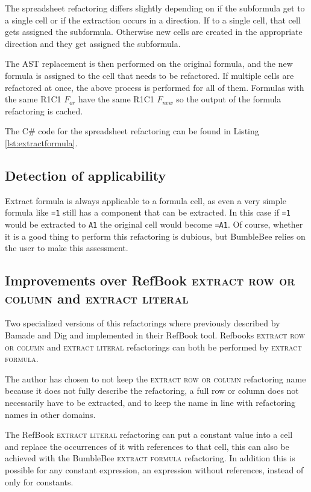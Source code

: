 \documentclass[12pt,a4paper,onecolumn,oneside,parskip]{memoir}
\newcommand{\f}[1]{\texttt{#1}}
\newcommand{\rf}[1]{\textsc{\lowercase{#1}}}
\begin{document}
The spreadsheet refactoring differs slightly depending on if the subformula get to a single cell or if the extraction occurs in a direction.
If to a single cell, that cell gets assigned the subformula.
Otherwise new cells are created in the appropriate direction and they get assigned the subformula.

The AST replacement is then performed on the original formula, and the new formula is assigned to the cell that needs to be refactored.
If multiple cells are refactored at once, the above process is performed for all of them.
Formulas with the same R1C1 $F_{or}$ have the same R1C1 $F_{new}$ so the output of the formula refactoring is cached.

The C\# code for the spreadsheet refactoring can be found in Listing \ref{lst:extractformula}.

\subsection{Detection of applicability}

Extract formula is always applicable to a formula cell, as even a very simple formula like \f{=1} still has a component that can be extracted.
In this case if \f{=1} would be extracted to \f{A1} the original cell would become \f{=A1}.
Of course, whether it is a good thing to perform this refactoring is dubious, but BumbleBee relies on the user to make this assessment.

\subsection{Improvements over RefBook \rf{Extract row or column} and \rf{Extract Literal}}
\label{subsubsec:improvementsextractformula}

Two specialized versions of this refactorings where previously described by Bamade and Dig \cite{badame2012refactoring} and implemented in their RefBook tool.
Refbooks \rf{Extract Row or column} and \rf{Extract Literal} refactorings can both be performed by \rf{Extract formula}.

The author has chosen to not keep the \rf{extract row or column} refactoring name because it does not fully describe the refactoring, a full row or column does not necessarily have to be extracted, and to keep the name in line with refactoring names in other domains.

The RefBook \rf{extract literal} refactoring can put a constant value into a cell and replace the occurrences of it with references to that cell, this can also be achieved with the BumbleBee \rf{extract formula} refactoring.
In addition this is possible for any constant expression, an expression without references, instead of only for constants.
\end{document}

